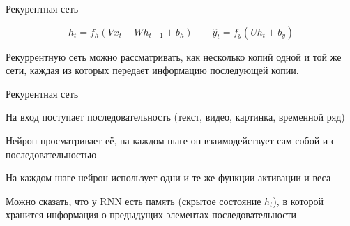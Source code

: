 \documentclass[notes,12pt, aspectratio=169]{beamer}
\newenvironment{wideitemize}{\itemize\addtolength{\itemsep}{10pt}}{\enditemize}
\begin{document}
\begin{frame}{Рекурентная сеть}
\begin{center}
\end{center}

\[
h_t = f_h( V x_t + W h_{t-1} + b_h) \qquad \hat y_t = f_y ( U h_t + b_y)
\]

\vfill
\small \centering
\alert{Рекуррентную сеть можно рассматривать, как несколько копий одной и той же сети, каждая из которых передает информацию последующей копии. }
\end{frame}


\begin{frame}{Рекурентная сеть}
\begin{wideitemize} 
	\item  На вход поступает последовательность (текст, видео, картинка, временной ряд)
	\item  Нейрон просматривает её, на каждом шаге он взаимодействует сам собой и с последовательностью 
	\item \alert{На каждом шаге нейрон использует одни и те же функции активации и веса}
	\item Можно сказать, что у RNN есть память (скрытое состояние $h_t$), в которой хранится информация о предыдущих элементах последовательности
\end{wideitemize} 
\end{frame}
\end{document}
